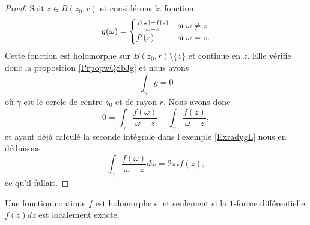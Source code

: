 \begin{proof}
    Soit \( z\in B(z_0,r)\) et considérons la fonction
    \begin{equation}
        g(\omega)=\begin{cases}
            \frac{ f(\omega)-f(z) }{ \omega-z }    &   \text{si \( \omega\neq z\)}\\
            f'(z)    &    \text{si \( \omega=z\)}.
        \end{cases}
    \end{equation}
    Cette fonction est holomorphe sur \( B(z_0,r)\setminus\{ z \}\) et continue en \( z\). Elle vérifie donc la proposition \ref{PrpopwQSbJg} et nous avons
    \begin{equation}
        \int_{\gamma}g=0
    \end{equation}
    où \( \gamma\) est le cercle de centre \( z_0\) et de rayon \( r\). Nous avons donc
    \begin{equation}
        0=\int_{\gamma}\frac{ f(\omega) }{ \omega-z }-\int_{\gamma}\frac{ f(z) }{ \omega-z },
    \end{equation}
    et ayant déjà calculé la seconde intégrale dans l'exemple \ref{ExradygL} nous en déduisons
    \begin{equation}
        \int_{\gamma}\frac{ f(\omega) }{ \omega-z }d\omega=2\pi if(z),
    \end{equation}
    ce qu'il fallait.
\end{proof}

\begin{proposition}\label{PropZOkfmO}
    Une fonction continue \( f\) est holomorphe si et seulement si la \( 1\)-forme différentielle \( f(z)dz\) est localement exacte.
\end{proposition}

